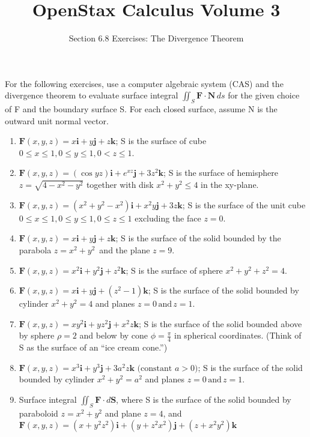 \documentclass{exercises}
\title{OpenStax Calculus Volume 3}
\subtitle{Section 6.8 Exercises: The Divergence Theorem}
\author{}
\date{}
\begin{document}
\maketitle


For the following exercises, use a computer algebraic system (CAS) and the divergence theorem to evaluate surface integral $\iint_{S}^{}\mathbf{F}\cdot \mathbf{N}\,ds$ for the given choice of F and the boundary surface S. For each closed surface, assume N is the outward unit normal vector.

\begin{enumerate}[start=1]
\item \techrequired $\mathbf{F}(x,y,z)=x\mathbf{i}+y\mathbf{j}+z\mathbf{k}$; S is the surface of cube $0\le x\le1,0\le y\le1,0<z\le1$.
\item \techrequired $\mathbf{F}(x,y,z)=(\cos yz)\mathbf{i}+e^{xz}\mathbf{j}+3z^{2}\mathbf{k}$; S is the surface of hemisphere $z=\sqrt{4-x^{2}-y^{2}}$ together with disk $x^{2}+y^{2}\le4$ in the xy-plane.
\item \techrequired $\mathbf{F}(x,y,z)=(x^{2}+y^{2}-x^{2})\mathbf{i}+x^{2}y\mathbf{j}+3z\mathbf{k}$; S is the surface of the unit cube $0\le x\le1,0\le y\le1,0\le z\le1$ excluding the face $z=0$.
\item \techrequired $\mathbf{F}(x,y,z)=x\mathbf{i}+y\mathbf{j}+z\mathbf{k}$; S is the surface of the solid bounded by the parabola $z=x^{2}+y^{2}\,$ and the plane $z=9$.
\item \techrequired $\mathbf{F}(x,y,z)=x^{2}\mathbf{i}+y^{2}\mathbf{j}+z^{2}\mathbf{k}$; S is the surface of sphere $x^{2}+y^{2}+z^{2}=4$.
\item \techrequired $\mathbf{F}(x,y,z)=x\mathbf{i}+y\mathbf{j}+(z^{2}-1)\mathbf{k}$; S is the surface of the solid bounded by cylinder $x^{2}+y^{2}=4$ and planes $z=0\,\text{and}\,z=1$.
\item \techrequired $\mathbf{F}(x,y,z)=xy^{2}\mathbf{i}+yz^{2}\mathbf{j}+x^{2}z\mathbf{k}$; S is the surface of the solid bounded above by sphere $\rho=2$ and below by cone $\phi=\frac{\pi}{4}$ in spherical coordinates. (Think of S as the surface of an ``ice cream cone.'')
\item \techrequired $\mathbf{F}(x,y,z)=x^{3}\mathbf{i}+y^{3}\mathbf{j}+3a^{2}z\mathbf{k}\text{ (constant }a>0\text{)}$; S is the surface of the solid bounded by cylinder $x^{2}+y^{2}=a^{2}$ and planes $z=0\,\text{and}\,z=1$.
\item \techrequired Surface integral $\iint_{S}\mathbf{F}\cdot d\mathbf{S}$, where S is the surface of the solid bounded by paraboloid $z=x^{2}+y^{2}$ and plane $z=4$, and $\mathbf{F}(x,y,z)=(x+y^{2}z^{2})\mathbf{i}+(y+z^{2}x^{2})\mathbf{j}+(z+x^{2}y^{2})\mathbf{k}$

\end{enumerate}
\end{document}

